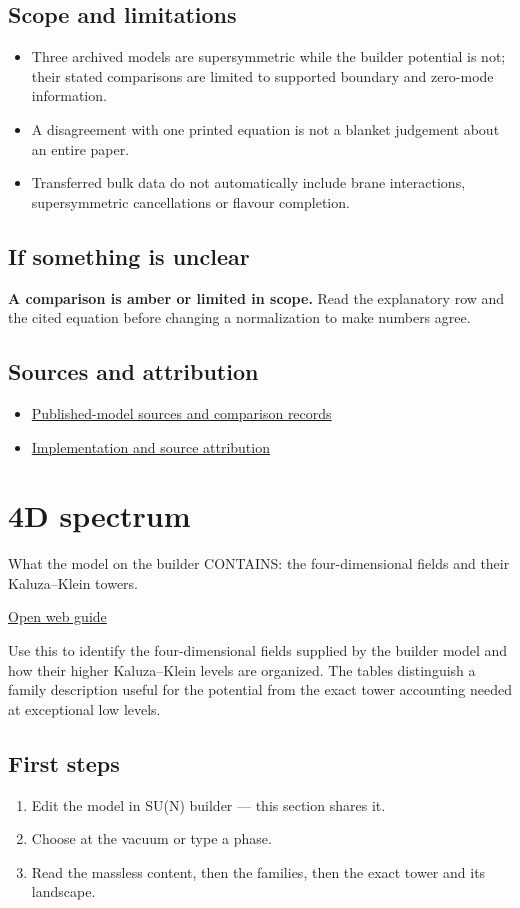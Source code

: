 \documentclass[11pt,a4paper]{article}
\begin{document}
\subsection*{Scope and limitations}
\begin{itemize}
\item Three archived models are supersymmetric while the builder potential is not; their stated comparisons are limited to supported boundary and zero-mode information.
\item A disagreement with one printed equation is not a blanket judgement about an entire paper.
\item Transferred bulk data do not automatically include brane interactions, supersymmetric cancellations or flavour completion.
\end{itemize}
\subsection*{If something is unclear}
\textbf{A comparison is amber or limited in scope.} Read the explanatory row and the cited equation before changing a normalization to make numbers agree.

\subsection*{Sources and attribution}
\begin{itemize}
\item \href{https://github.com/karlesmarin/ghu-lab/blob/main/src/modules/papers.mjs}{Published-model sources and comparison records}
\item \href{https://github.com/karlesmarin/ghu-lab/blob/main/src/sections/papers_section.js}{Implementation and source attribution}
\end{itemize}
\section{4D spectrum}
What the model on the builder CONTAINS: the four-dimensional fields and their Kaluza--Klein towers.

\href{https://karlesmarin.github.io/ghu-explorer/guide/spectrum5d/index.html}{Open web guide}

Use this to identify the four-dimensional fields supplied by the builder model and how their higher Kaluza--Klein levels are organized. The tables distinguish a family description useful for the potential from the exact tower accounting needed at exceptional low levels.
\subsection*{First steps}
\begin{enumerate}
\item Edit the model in SU(N) builder --- this section shares it.
\item Choose at the vacuum or type a phase.
\item Read the massless content, then the families, then the exact tower and its landscape.
\end{enumerate}
\end{document}
